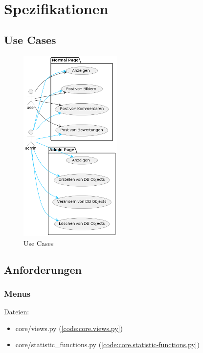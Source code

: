 \chapter{Spezifikationen}

\section{Use Cases} \label{sec:UseCases}
\begin{figure}[ht!]
    \centering
    \includegraphics[width=0.45\textwidth]{images/Use Case.png}
    \caption{Use Cases}
    \label{fig:UseCases}
\end{figure}

\newpage

\section{Anforderungen} \label{sec:Anforderungen}
\subsection{Menus} \label{spez:Menus}

Dateien:
\begin{itemize}
    \item core/views.py (\ref{code:core.views.py})
    \item core/statistic\_functions.py (\ref{code:core.statistic-functions.py})
\end{itemize}

